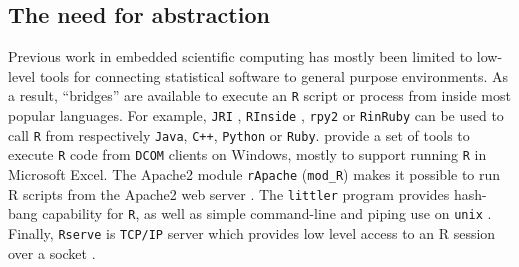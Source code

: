 \documentclass{article}
\newcommand{\R}{\texttt{R}\xspace}
\newcommand{\API}{\texttt{API}\xspace}
\begin{document}


\subsection{The need for abstraction}

Previous work in embedded scientific computing has mostly been limited to low-level tools for connecting statistical software to general purpose environments. As a result, ``bridges'' are available to execute an \R script or process from inside most popular languages. For example, \texttt{JRI} \citep{rjava}, \texttt{RInside} \citep{eddelbuettel2011rcpp}, \texttt{rpy2} \citep{gautier2008rpy2} or \texttt{RinRuby} \citep{dahl2008rinruby} can be used to call \R from respectively \texttt{Java}, \texttt{C++}, \texttt{Python} or \texttt{Ruby}. \cite{heiberger2009r} provide a set of tools to execute \R code from \texttt{DCOM} clients on Windows, mostly to support running \R in Microsoft Excel. The Apache2 module \texttt{rApache} (\texttt{mod\_R}) makes it possible to run R scripts from the Apache2 web server \citep{horner2013rapache}. The \texttt{littler} program provides hash-bang capability for \R, as well as simple command-line and piping use on \texttt{unix} \citep{littler}. Finally, \texttt{Rserve} is \texttt{TCP/IP} server which provides low level access to an R session over a socket \citep{urbanek2013rserve}. 
\end{document}
